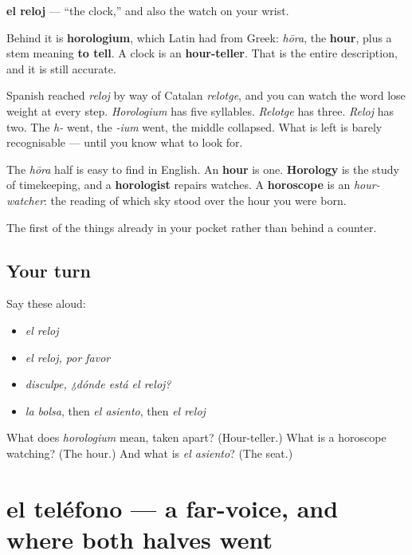 \begin{cousinweb}
\textbf{el reloj} — \textquotedblleft{}the clock,\textquotedblright{} and also the watch on your wrist.

Behind it is \textbf{horologium}, which Latin had from Greek: \emph{hōra}, the \textbf{hour}, plus a stem meaning \textbf{to tell}. A clock is an \textbf{hour-teller}. That is the entire description, and it is still accurate.

Spanish reached \emph{reloj} by way of Catalan \emph{relotge}, and you can watch the word lose weight at every step. \emph{Horologium} has five syllables. \emph{Relotge} has three. \emph{Reloj} has two. The \emph{h-} went, the \emph{-ium} went, the middle collapsed. What is left is barely recognisable — until you know what to look for.

The \emph{hōra} half is easy to find in English. An \textbf{hour} is one. \textbf{Horology} is the study of timekeeping, and a \textbf{horologist} repairs watches. A \textbf{horoscope} is an \emph{hour-watcher}: the reading of which sky stood over the hour you were born.
\end{cousinweb}

\begin{grammarlens}[title={What you've built}]
The first of the things already in your pocket rather than behind a counter.
\end{grammarlens}

\subsection*{Your turn}
Say these aloud:

\begin{itemize}
\raggedright
  \item \emph{el reloj}
  \item \emph{el reloj, por favor}
  \item \emph{disculpe, ¿dónde está el reloj?}
  \item \emph{la bolsa}, then \emph{el asiento}, then \emph{el reloj}
\end{itemize}

\begin{tcolorbox}[breakable,colback=teal!4,colframe=teal!35!black,title={Before you move on}]
What does \emph{horologium} mean, taken apart? (Hour-teller.) What is a horoscope watching? (The hour.) And what is \emph{el asiento}? (The seat.)
\end{tcolorbox}
\section[el teléfono]{el teléfono — a far-voice, and where both halves went}

